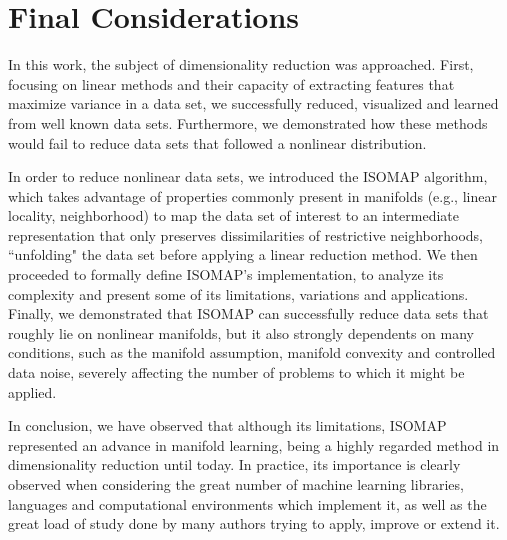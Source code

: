 \setcounter{secnumdepth}{-1}
\chapter{Final Considerations}

In this work, the subject of dimensionality reduction was approached. First, focusing on linear methods and their capacity of extracting features that maximize variance in a data set, we successfully reduced, visualized and learned from well known data sets. Furthermore, we demonstrated how these methods would fail to reduce data sets that followed a nonlinear distribution.

In order to reduce nonlinear data sets, we introduced the ISOMAP algorithm, which takes advantage of properties commonly present in manifolds (e.g., linear locality, neighborhood) to map the data set of interest to an intermediate representation that only preserves dissimilarities of restrictive neighborhoods, ``unfolding" the data set before applying a linear reduction method. We then proceeded to formally define ISOMAP's implementation, to analyze its complexity and present some of its limitations, variations and applications. Finally, we demonstrated that ISOMAP can successfully reduce data sets that roughly lie on nonlinear manifolds, but it also strongly dependents on many conditions, such as the manifold assumption, manifold convexity and controlled data noise, severely affecting the number of problems to which it might be applied.

In conclusion, we have observed that although its limitations, ISOMAP represented an advance in manifold learning, being a highly regarded method in dimensionality reduction until today. In practice, its importance is clearly observed when considering the great number of machine learning libraries, languages and computational environments which implement it, as well as the great load of study done by many authors trying to apply, improve or extend it.
